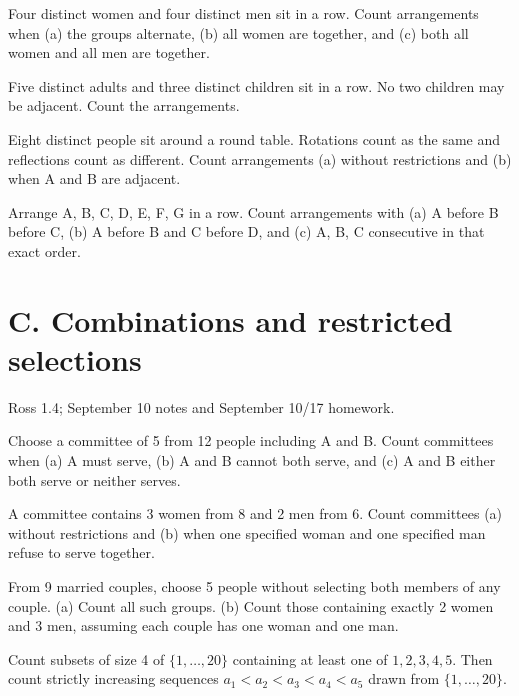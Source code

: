 \documentclass[11pt]{article}
\newcommand{\qid}[1]{\par\needspace{5\baselineskip}\noindent{\color{accent}\bfseries #1}\quad}
\newcommand{\source}[1]{{\small\color{muted}#1}\par}
\begin{document}
\qid{B2} Four distinct women and four distinct men sit in a row. Count arrangements when (a) the groups alternate, (b) all women are together, and (c) both all women and all men are together.
\par\vspace{0.40in}

\qid{B3} Five distinct adults and three distinct children sit in a row. No two children may be adjacent. Count the arrangements.
\par\vspace{0.40in}

\qid{B4} Eight distinct people sit around a round table. Rotations count as the same and reflections count as different. Count arrangements (a) without restrictions and (b) when A and B are adjacent.
\par\vspace{0.40in}

\qid{B5} Arrange A, B, C, D, E, F, G in a row. Count arrangements with (a) A before B before C, (b) A before B and C before D, and (c) A, B, C consecutive in that exact order.
\par\vspace{0.40in}


\clearpage
\section*{C. Combinations and restricted selections}
\source{Ross 1.4; September 10 notes and September 10/17 homework.}
\qid{C1} Choose a committee of 5 from 12 people including A and B. Count committees when (a) A must serve, (b) A and B cannot both serve, and (c) A and B either both serve or neither serves.
\par\vspace{0.40in}

\qid{C2} A committee contains 3 women from 8 and 2 men from 6. Count committees (a) without restrictions and (b) when one specified woman and one specified man refuse to serve together.
\par\vspace{0.40in}

\qid{C3} From 9 married couples, choose 5 people without selecting both members of any couple. (a) Count all such groups. (b) Count those containing exactly 2 women and 3 men, assuming each couple has one woman and one man.
\par\vspace{0.40in}

\qid{C4} Count subsets of size 4 of \(\{1,\ldots,20\}\) containing at least one of \(1,2,3,4,5\). Then count strictly increasing sequences \(a_1<a_2<a_3<a_4<a_5\) drawn from \(\{1,\ldots,20\}\).
\par\vspace{0.40in}
\end{document}
